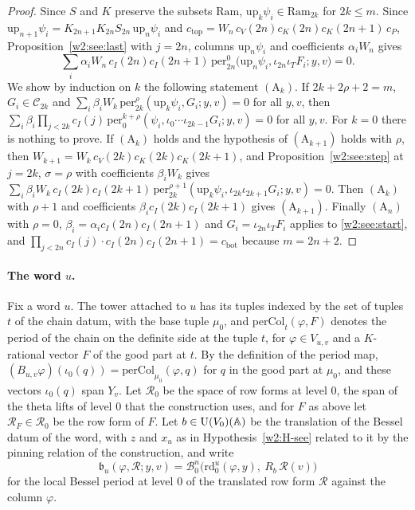 \begin{proof}
Since $S$ and $K$ preserve the subsets $\mathrm{Ram}$, $\mathrm{up}_k\psi_i\in\mathrm{Ram}_{2k}$ for $2k\le m$. Since $\mathrm{up}_{n+1}\psi_i=K_{2n+1}K_{2n}S_{2n}\,\mathrm{up}_n\psi_i$ and $c_{\mathrm{top}}=W_n\,c_V(2n)c_K(2n)c_K(2n+1)\,c_P$, Proposition~\ref{w2:see:last} with $j=2n$, columns $\mathrm{up}_n\psi_i$ and coefficients $\alpha_iW_n$ gives
\begin{equation}\label{w2:see:start}
\sum_i\alpha_iW_n\,c_I(2n)c_I(2n+1)\,\mathrm{per}^0_{2n}\bigl(\mathrm{up}_n\psi_i,\iota_{2n}\iota_TF_i;y,v\bigr)=0 .
\end{equation}
We show by induction on $k$ the following statement $(\mathrm A_k)$. If $2k+2\rho+2=m$, $G_i\in\mathcal C_{2k}$ and $\sum_i\beta_iW_k\,\mathrm{per}^\rho_{2k}(\mathrm{up}_k\psi_i,G_i;y,v)=0$ for all $y,v$, then $\sum_i\beta_i\prod_{j<2k}c_I(j)\,\mathrm{per}^{k+\rho}_0(\psi_i,\iota_0\cdots\iota_{2k-1}G_i;y,v)=0$ for all $y,v$. For $k=0$ there is nothing to prove. If $(\mathrm A_k)$ holds and the hypothesis of $(\mathrm A_{k+1})$ holds with $\rho$, then $W_{k+1}=W_k\,c_V(2k)c_K(2k)c_K(2k+1)$, and Proposition~\ref{w2:see:step} at $j=2k$, $\sigma=\rho$ with coefficients $\beta_iW_k$ gives $\sum_i\beta_iW_k\,c_I(2k)c_I(2k+1)\,\mathrm{per}^{\rho+1}_{2k}(\mathrm{up}_k\psi_i,\iota_{2k}\iota_{2k+1}G_i;y,v)=0$. Then $(\mathrm A_k)$ with $\rho+1$ and coefficients $\beta_ic_I(2k)c_I(2k+1)$ gives $(\mathrm A_{k+1})$. Finally $(\mathrm A_n)$ with $\rho=0$, $\beta_i=\alpha_ic_I(2n)c_I(2n+1)$ and $G_i=\iota_{2n}\iota_TF_i$ applies to \eqref{w2:see:start}, and $\prod_{j<2n}c_I(j)\cdot c_I(2n)c_I(2n+1)=c_{\mathrm{bot}}$ because $m=2n+2$.
\end{proof}

\paragraph{The word $u$.} Fix a word $u$. The tower attached to $u$ has its tuples indexed by the set of tuples $t$ of the chain datum, with the base tuple $\mu_0$, and $\mathrm{perCol}_t(\varphi,F)$ denotes the period of the chain on the definite side at the tuple $t$, for $\varphi\in V_{u,v}$ and a $K$-rational vector $F$ of the good part at $t$. By the definition of the period map, $(B_{u,v}\varphi)(\iota_0(q))=\mathrm{perCol}_{\mu_0}(\varphi,q)$ for $q$ in the good part at $\mu_0$, and these vectors $\iota_0(q)$ span $Y_v$. Let $\mathcal R_0$ be the space of row forms at level $0$, the span of the theta lifts of level $0$ that the construction uses, and for $F$ as above let $\mathcal R_F\in\mathcal R_0$ be the row form of $F$. Let $b\in\mathrm U(V_0)(\mathbb A)$ be the translation of the Bessel datum of the word, with $z$ and $x_u$ as in Hypothesis~\ref{w2:H-see} related to it by the pinning relation of the construction, and write
\[
\mathfrak b_u(\varphi,\mathcal R;y,v)=\mathcal B^n_0\bigl(\mathrm{rd}^u_0(\varphi,y),\ R_b\,\mathcal R(v)\bigr)
\]
for the local Bessel period at level $0$ of the translated row form $\mathcal R$ against the column $\varphi$.

